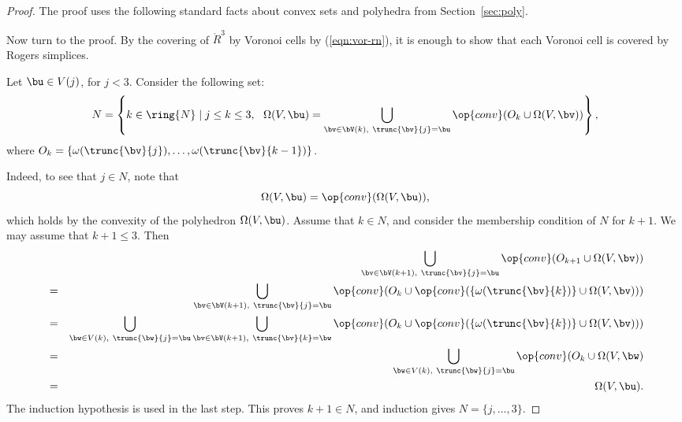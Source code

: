 \begin{proof}
The proof uses the following standard facts about convex sets and polyhedra from
Section~\ref{sec:poly}.


%
Now turn to the proof.  
By the covering of $\ring{R}^3$  by Voronoi cells by (\ref{eqn:vor-rn}),
it is enough to show that each Voronoi cell is covered by Rogers simplices.

Let $\bu\in V(j)$, for $j<3$.
Consider the following set:
\begin{displaymath}
N = \left\{k\in\ring{N}\mid j\le k\le 3, ~~\Omega(V,\bu) 
= \bigcup_{\bv \in \bV(k),~\trunc{\bv}{j}=\bu}
\op{conv}(O_k \cup\Omega(V,\bv)) %
\right\},
\end{displaymath}
where $O_k = \{\omega(\trunc{\bv}{j}),\ldots,\omega(\trunc{\bv}{k-1})\}$.

  Indeed, to see that $j\in N$, note that
\begin{displaymath}
\Omega(V,\bu) = \op{conv}(\Omega(V,\bu)),
\end{displaymath}
which holds by the convexity of the polyhedron $\Omega(V,\bu)$.
Assume that $k\in N$, and consider the membership condition of $N$  for
$k+1$.  We may assume that $k+1\le 3$.
Then
\begin{eqnarray*}
&\phantom{=}&\bigcup _{\bv \in \bV(k+1),~\trunc{\bv}{j}=\bu}
\op{conv}(O_{k+1} \cup\Omega(V,\bv))
%
\vspace{6pt}\\
&=&\bigcup _{\bv \in \bV(k+1),~\trunc{\bv}{j}=\bu}
\op{conv}(O_{k} \cup\op{conv}(\{\omega(\trunc{\bv}{k})\}\cup\Omega(V,\bv)))
\vspace{6pt}\\
&=&\bigcup _{\bw\in V(k),~\trunc{\bw}{j}=\bu}
\bigcup_{\bv \in \bV(k+1),~\trunc{\bv}{k}=\bw}
\op{conv}(O_{k} \cup\op{conv}(\{\omega(\trunc{\bv}{k})\}\cup\Omega(V,\bv)))
\vspace{6pt}\\
&=&\bigcup _{\bw\in V(k),~\trunc{\bw}{j}=\bu}
\op{conv}(O_{k} \cup \Omega(V,\bw)    
\vspace{6pt}\\
&=&\quad\Omega(V,\bu).
\end{eqnarray*}
The induction hypothesis is used in the last step.  
This proves $k+1\in N$, and induction gives $N=\{j,\ldots,3\}$.


\end{proof}

